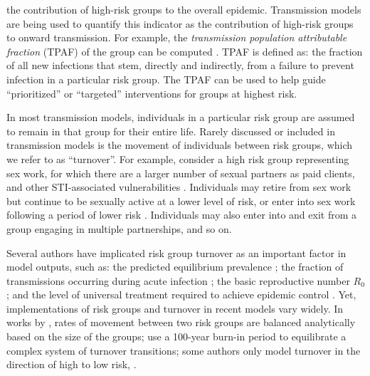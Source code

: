 the contribution of high-risk groups to the overall epidemic. %
Transmission models are being used to quantify
this indicator as the contribution of high-risk groups to onward transmission.
For example, the \textit{transmission population attributable fraction} (TPAF)
of the group can be computed \citep{Mishra2012}.
TPAF is defined as: the fraction of all new infections that stem,
directly and indirectly, from a failure to prevent infection
in a particular risk group.
The TPAF can be used to help guide ``prioritized'' or ``targeted'' interventions
for groups at highest risk.
\par
In most transmission models, individuals in a particular risk group
are assumed to remain in that group for their entire life.
Rarely discussed or included in transmission models
is the movement of individuals between risk groups,
which we refer to as ``turnover''.
For example, consider a high risk group representing sex work,
for which there are a larger number of sexual partners as paid clients,
and other STI-associated vulnerabilities \citep{Watts2010}.
Individuals may
retire from sex work but continue to be sexually active at a lower level of risk,
or enter into sex work following a period of lower risk \citep{Boily2015}.
Individuals may also enter into and exit from
a group engaging in multiple partnerships, and so on.
\par
Several authors have implicated risk group turnover as 
an important factor in model outputs, such as:
the predicted equilibrium prevalence \citep{Stigum1994,Eaton2014};
the fraction of transmissions occurring during acute infection \citep{Zhang2012};
the basic reproductive number $R_0$ \citep{Henry2015}; and
the level of universal treatment required to achieve epidemic control \citep{Henry2015}.
Yet, implementations of risk groups and turnover in recent models vary widely.
In works by \citeauthor{Koopman1997},
rates of movement between two risk groups
are balanced analytically based on the size of the groups;
\citet{Boily2015} use a 100-year burn-in period
to equilibrate a complex system of turnover transitions;
some authors only model turnover in the direction of high to low risk,
\citep{Stigum1994,Eaton2014}.

